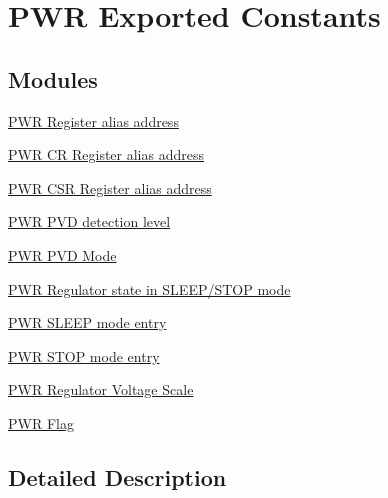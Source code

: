 \hypertarget{group___p_w_r___exported___constants}{\section{P\-W\-R Exported Constants}
\label{group___p_w_r___exported___constants}
}
\subsection*{Modules}
\begin{DoxyCompactItemize}
\item 
\hyperlink{group___p_w_r__register__alias__address}{P\-W\-R Register alias address}
\item 
\hyperlink{group___p_w_r___c_r__register__alias}{P\-W\-R C\-R Register alias address}
\item 
\hyperlink{group___p_w_r___c_s_r__register__alias}{P\-W\-R C\-S\-R Register alias address}
\item 
\hyperlink{group___p_w_r___p_v_d__detection__level}{P\-W\-R P\-V\-D detection level}
\item 
\hyperlink{group___p_w_r___p_v_d___mode}{P\-W\-R P\-V\-D Mode}
\item 
\hyperlink{group___p_w_r___regulator__state__in___s_l_e_e_p___s_t_o_p__mode}{P\-W\-R Regulator state in S\-L\-E\-E\-P/\-S\-T\-O\-P mode}
\item 
\hyperlink{group___p_w_r___s_l_e_e_p__mode__entry}{P\-W\-R S\-L\-E\-E\-P mode entry}
\item 
\hyperlink{group___p_w_r___s_t_o_p__mode__entry}{P\-W\-R S\-T\-O\-P mode entry}
\item 
\hyperlink{group___p_w_r___regulator___voltage___scale}{P\-W\-R Regulator Voltage Scale}
\item 
\hyperlink{group___p_w_r___flag}{P\-W\-R Flag}
\end{DoxyCompactItemize}


\subsection{Detailed Description}
